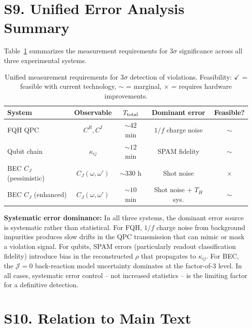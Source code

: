 \documentclass[prd,aps,showpacs,superscriptaddress,twocolumn]{revtex4-2}
\begin{document}
\section{S9. Unified Error Analysis Summary}

Table~\ref{tab:unified} summarizes the measurement requirements for $3\sigma$ significance across all three experimental systems.

\begin{table}[h]
\centering
\caption{Unified measurement requirements for $3\sigma$ detection of violations. Feasibility: $\checkmark$ = feasible with current technology, $\sim$ = marginal, $\times$ = requires hardware improvements.}
\label{tab:unified}
\begin{tabular}{lcccc}
\toprule
\textbf{System} & \textbf{Observable} & \textbf{$T_{\rm total}$} & \textbf{Dominant error} & \textbf{Feasible?} \\
\midrule
FQH QPC & $C^R, C^I$ & $\sim 42$ min & $1/f$ charge noise & $\sim$ \\
Qubit chain & $\kappa_{ij}$ & $\sim 12$ min & SPAM fidelity & $\sim$ \\
BEC $C_J$ (pessimistic) & $C_J(\omega,\omega')$ & $\sim 330$ h & Shot noise & $\times$ \\
BEC $C_J$ (enhanced) & $C_J(\omega,\omega')$ & $\sim 10$ min & Shot noise + $T_H$ sys. & $\sim$ \\
\bottomrule
\end{tabular}
\end{table}

\textbf{Systematic error dominance:} In all three systems, the dominant error source is systematic rather than statistical. For FQH, $1/f$ charge noise from background impurities produces slow drifts in the QPC transmission that can mimic or mask a violation signal. For qubits, SPAM errors (particularly readout classification fidelity) introduce bias in the reconstructed $\rho$ that propagates to $\kappa_{ij}$. For BEC, the $\mathcal{J}=0$ back-reaction model uncertainty dominates at the factor-of-3 level. In all cases, systematic error control -- not increased statistics -- is the limiting factor for a definitive detection.

\section{S10. Relation to Main Text}
\end{document}
